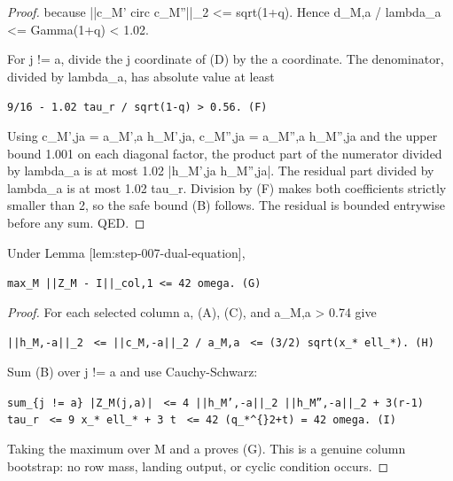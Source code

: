 \begin{lemma}
\begin{proof}
because ||c\_M' circ c\_M''||\_2 <= sqrt(1+q).  Hence
d\_M,a / lambda\_a <= Gamma(1+q) < 1.02.

For j != a, divide the j coordinate of (D) by the a coordinate.  The
denominator, divided by lambda\_a, has absolute value at least

\texttt{9/16 - 1.02 tau\_r / sqrt(1-q) > 0.56.                       (F)}

Using c\_M',ja = a\_M',a h\_M',ja, c\_M'',ja = a\_M'',a h\_M'',ja and the
upper bound 1.001 on each diagonal factor, the product part of the numerator
divided by lambda\_a is at most 1.02 |h\_M',ja h\_M'',ja|.  The residual part
divided by lambda\_a is at most 1.02 tau\_r.  Division by (F) makes both
coefficients strictly smaller than 2, so the safe bound (B) follows.  The
residual is bounded entrywise before any sum.  QED.


\end{proof}
\end{lemma}
\begin{proposition}\label{prop:step-007-column}

Under Lemma [lem:step-007-dual-equation],

\texttt{max\_M ||Z\_M - I||\_col,1 <= 42 omega.                          (G)}

\begin{proof}

For each selected column a, (A), (C), and a\_M,a > 0.74 give

\texttt{||h\_M,-a||\_2}
\texttt{  <= ||c\_M,-a||\_2 / a\_M,a}
\texttt{  <= (3/2) sqrt(x\_* ell\_*).                                  (H)}

Sum (B) over j != a and use Cauchy-Schwarz:

\texttt{sum\_\{j != a\} |Z\_M(j,a)|}
\texttt{  <= 4 ||h\_M',-a||\_2 ||h\_M'',-a||\_2 + 3(r-1) tau\_r}
\texttt{  <= 9 x\_* ell\_* + 3 t}
\texttt{  <= 42 (q\_*\textasciicircum\{\}2+t) = 42 omega.                                 (I)}

Taking the maximum over M and a proves (G).  This is a genuine column
bootstrap: no row mass, landing output, or cyclic condition occurs.
\end{proof}


\end{proposition}
